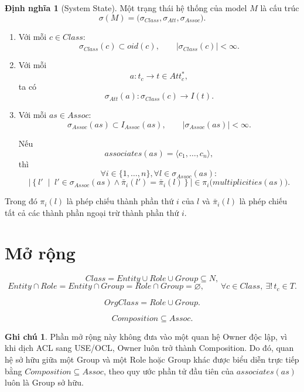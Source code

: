 \documentclass[12pt,a4paper]{article}
\theoremstyle{definition}
\newtheorem{dinhnghia}{Định nghĩa}
\newtheorem*{ghichu}{Ghi chú}
\begin{document}
\begin{dinhnghia}[System State]
Một trạng thái hệ thống của model $M$ là cấu trúc
\[
\sigma(M)
=
\bigl(
\sigma_{Class},
\sigma_{Att},
\sigma_{Assoc}
\bigr).
\]

\begin{enumerate}
    \item Với mỗi $c\in Class$:
    \[
    \sigma_{Class}(c)\subset oid(c),
    \qquad
    |\sigma_{Class}(c)|<\infty.
    \]

    \item Với mỗi
    \[
    a:t_c\to t\in Att_c^{*},
    \]
    ta có
    \[
    \sigma_{Att}(a):
    \sigma_{Class}(c)\to I(t).
    \]

    \item Với mỗi $as\in Assoc$:
    \[
    \sigma_{Assoc}(as)\subset I_{Assoc}(as),
    \qquad
    |\sigma_{Assoc}(as)|<\infty.
    \]

    Nếu
    \[
    associates(as)=\langle c_1,\ldots,c_n\rangle,
    \]
    thì
    \[
    \forall i\in\{1,\ldots,n\},
    \forall l\in\sigma_{Assoc}(as):
    \]
    \[
    \left|
    \left\{
    l'
    \;\middle|\;
    l'\in\sigma_{Assoc}(as)
    \land
    \bar{\pi}_i(l')=\bar{\pi}_i(l)
    \right\}
    \right|
    \in
    \pi_i\bigl(multiplicities(as)\bigr).
    \]
\end{enumerate}
\end{dinhnghia}

Trong đó $\pi_i(l)$ là phép chiếu thành phần thứ $i$ của $l$ và
$\bar{\pi}_i(l)$ là phép chiếu tất cả các thành phần ngoại trừ thành phần thứ $i$.


\section{Mở rộng}

\[
Class = Entity \cup Role \cup Group \subseteq N,
\]
\[
Entity\cap Role
=
Entity\cap Group
=
Role\cap Group
=
\varnothing,
\qquad
\forall c\in Class,\ \exists!\,t_c\in T.
\]

\[
OrgClass = Role\cup Group.
\]

\[
Composition\subseteq Assoc.
\]


\begin{ghichu}
Phần mở rộng này không đưa vào một quan hệ Owner độc lập, vì khi dịch ACL
sang USE/OCL, Owner luôn trở thành Composition. Do đó, quan hệ sở hữu giữa
một Group và một Role hoặc Group khác được biểu diễn trực tiếp bằng
$Composition\subseteq Assoc$, theo quy ước phần tử đầu tiên của
$associates(as)$ luôn là Group sở hữu.
\end{ghichu}
\end{document}

